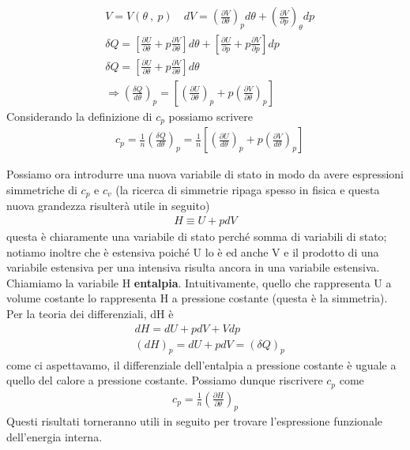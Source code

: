 \documentclass[10pt,a4paper]{article}
\begin{document}
\begin{itemize}
	\begin{align*} 
		&V = V(\theta\ ,\ p) \quad dV = \left( \frac{\partial V}{\partial \theta}\right)_p d\theta + \left( \frac{\partial V}{\partial p}\right)_{\theta} dp\\
		&\delta Q = \left[\frac{\partial U}{\partial \theta} + p \frac{\partial V}{\partial \theta}\right]d\theta + \left[\frac{\partial U}{\partial p}+ p \frac{\partial V}{\partial p} \right]dp\\
		&\delta Q = \left[\frac{\partial U}{\partial \theta} + p \frac{\partial V}{\partial \theta}\right]d\theta\\
		&\Rightarrow \left(\frac{\delta Q}{d \theta}\right)_p = \left[\left(\frac{\partial U}{\partial \theta}\right)_p + p \left(\frac{\partial V}{\partial \theta}\right)_p\right]
	\end{align*}  
	Considerando la definizione di \(c_p\) possiamo scrivere
	\begin{align*} 
		&c_p = \frac{1}{n}\left(\frac{\delta Q}{d\theta}\right)_p = \frac{1}{n} \left[\left(\frac{\partial U}{d \theta}\right)_p + p \left(\frac{\partial V}{d \theta}\right)_p\right]
	\end{align*} 
\end{itemize} 
Possiamo ora introdurre una nuova variabile di stato in modo da avere espressioni simmetriche di \(c_p\) e \(c_v\) (la ricerca di simmetrie ripaga spesso in fisica e questa nuova grandezza risulterà utile in seguito)
\begin{align*} 
	H \equiv U + pdV
\end{align*} 
questa è chiaramente una variabile di stato perché somma di variabili di stato; notiamo inoltre che è estensiva poiché U lo è ed anche V e il prodotto di una variabile estensiva per una intensiva risulta ancora in una variabile estensiva. Chiamiamo la variabile H \textbf{entalpia}. Intuitivamente, quello che rappresenta U a volume costante lo rappresenta H a pressione costante (questa è la simmetria). Per la teoria dei differenziali, dH è
\begin{align*}  
	&dH = dU + pdV + Vdp \\
	&(dH)_p = dU + pdV = (\delta Q)_p
\end{align*}  
come ci aspettavamo, il differenziale dell'entalpia a pressione costante è uguale a quello del calore a pressione costante. Possiamo dunque riscrivere \(c_p\) come
\begin{align*}  
	c_p = \frac{1}{n} \left(\frac{\partial H}{\partial \theta}\right)_p
\end{align*}  
Questi risultati torneranno utili in seguito per trovare l'espressione funzionale dell'energia interna. 
\end{document}
